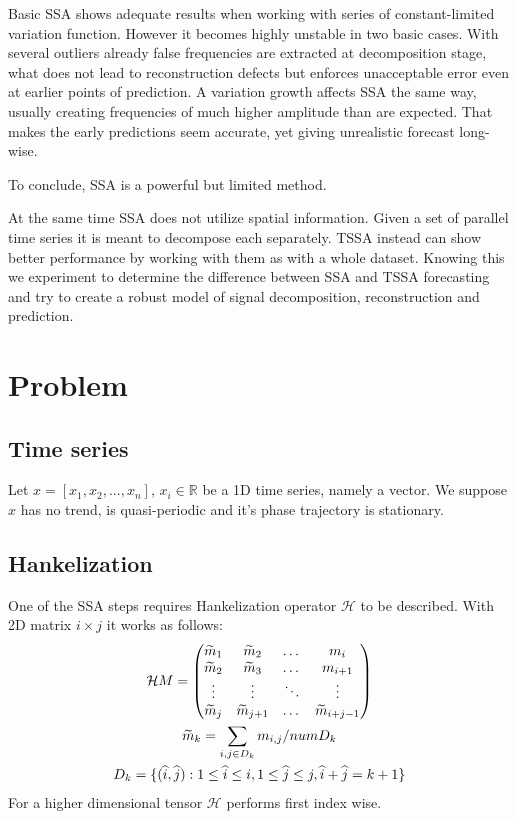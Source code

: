 \documentclass{article}
\begin{document}
Basic SSA shows \cite{golyandina2020} adequate results when working with series of constant-limited variation function. However it becomes highly unstable in two basic cases. With several outliers already false frequencies are extracted at decomposition stage, what does not lead to reconstruction defects but enforces unacceptable error even at earlier points of prediction. A variation growth affects SSA the same way, usually creating frequencies of much higher amplitude than are expected. That makes the early predictions seem accurate, yet giving unrealistic forecast long-wise.

To conclude, SSA is a powerful but limited method.

At the same time SSA does not utilize spatial information. Given a set of parallel time series it is meant to decompose each separately. TSSA instead can show better performance by working with them as with a whole dataset. Knowing this we experiment to determine the difference between SSA and TSSA forecasting and try to create a robust model of signal decomposition, reconstruction and prediction.
\section{Problem}
\label{sec:Problem}

\subsection{Time series}

Let \(x = \left[x_1, x_2, ..., x_n\right]\), \(x_i \in \mathbb{R}\) be a 1D time series, namely a vector. We suppose \(x\) has no trend, is quasi-periodic and it's phase trajectory is stationary.

\subsection{Hankelization}

One of the SSA steps requires Hankelization operator \(\mathcal{H}\) to be described. With 2D matrix \(i \times j\) it works as follows:
\begin{gather}
\mathcal{H}M =
\begin{pmatrix}
	\widetilde{m}_{1} & \widetilde{m}_{2} & \dots & m_{i} \\
	\widetilde{m}_{2} & \widetilde{m}_{3} & \dots & m_{i + 1} \\
	\vdots & \vdots & \ddots & \vdots \\
	\widetilde{m}_{j} & \widetilde{m}_{j + 1} &  \dots & \widetilde{m}_{i + j - 1}
\end{pmatrix} \notag \\
\widetilde{m}_{k} = \sum_{i, j \in D_k} m_{i,j} / numD_k \\
D_k = \{(\widehat{i}, \widehat{j}) : 1 \leq \widehat{i} \leq i, 1 \leq \widehat{j} \leq j, \widehat{i} + \widehat{j} = k + 1\} \notag
\end{gather} 
For a  higher dimensional tensor \(\mathcal{H}\) performs first index wise.
\end{document}
